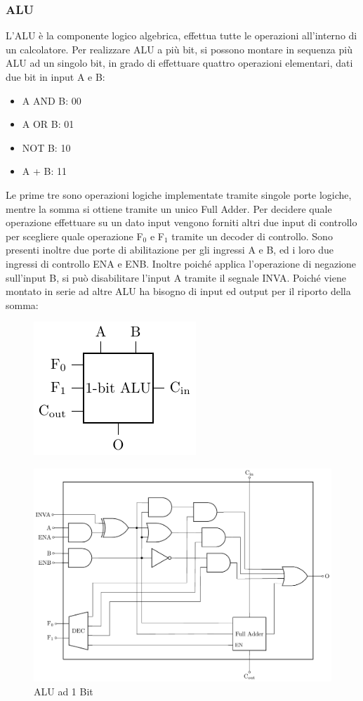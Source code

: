\documentclass{article}
\numberwithin{equation}{subsection}
\begin{document}
\subsubsection{ALU}

L'ALU è la componente logico algebrica, effettua tutte le operazioni all'interno di un calcolatore. Per realizzare ALU a più bit, si possono montare in sequenza più ALU ad un singolo bit, in grado di 
effettuare quattro operazioni elementari, dati due bit in input A e B:
\begin{itemize}
    \item A AND B: 00
    \item A OR B: 01
    \item NOT B: 10
    \item A + B: 11
\end{itemize}
Le prime tre sono operazioni logiche implementate tramite singole porte logiche, mentre la somma si ottiene tramite un unico Full Adder. Per decidere quale operazione effettuare su un dato 
input vengono forniti altri due input di controllo per scegliere quale operazione F$_0$ e F$_1$ tramite un decoder di controllo. Sono presenti inoltre due porte di abilitazione per gli ingressi A e B, ed i loro due 
ingressi di controllo ENA e ENB. Inoltre poiché applica l'operazione di negazione sull'input B, si può disabilitare l'input A tramite il segnale INVA. Poiché viene montato in serie ad altre 
ALU ha bisogno di input ed output per il riporto della somma:
\begin{figure}[H]%
    \centering%
    \includegraphics{alu-1-bit-compatta.pdf}%
\end{figure}
\begin{figure}[H]%
    \centering%
    \includegraphics[scale=0.84]{alu-1-bit.pdf}%
    \caption{ALU ad 1 Bit}%
\end{figure}
\end{document}
